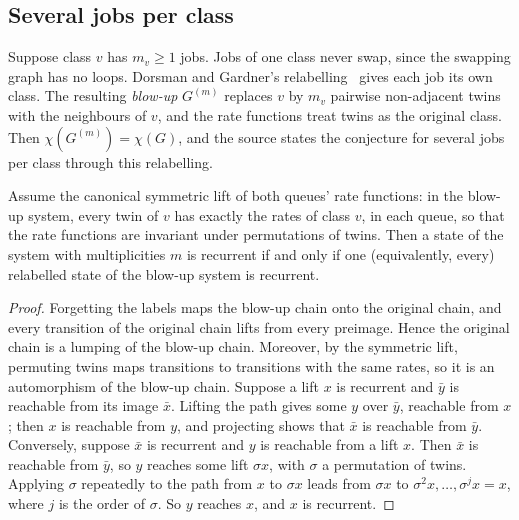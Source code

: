 \documentclass[11pt,a4paper]{article}
\theoremstyle{plain}
\theoremstyle{plain}
\begin{document}
\subsection{Several jobs per class}\label{sec:multiplicity}

Suppose class $v$ has $m_v\ge1$ jobs. Jobs of one class never swap, since the swapping graph has no loops. Dorsman and Gardner's relabelling~\cite[Remark~9]{DG2024} gives each job its own class. The resulting \emph{blow-up} $G^{(m)}$ replaces $v$ by $m_v$ pairwise non-adjacent twins with the neighbours of $v$, and the rate functions treat twins as the original class. Then $\chi(G^{(m)})=\chi(G)$, and the source states the conjecture for several jobs per class through this relabelling.

\begin{proposition}\label{prop:multiplicity}
Assume the canonical symmetric lift of both queues' rate functions: in the blow-up system, every twin of $v$ has exactly the rates of class $v$, in each queue, so that the rate functions are invariant under permutations of twins. Then a state of the system with multiplicities $m$ is recurrent if and only if one (equivalently, every) relabelled state of the blow-up system is recurrent.
\end{proposition}

\begin{proof}
Forgetting the labels maps the blow-up chain onto the original chain, and every transition of the original chain lifts from every preimage. Hence the original chain is a lumping of the blow-up chain. Moreover, by the symmetric lift, permuting twins maps transitions to transitions with the same rates, so it is an automorphism of the blow-up chain. Suppose a lift $x$ is recurrent and $\bar y$ is reachable from its image $\bar x$. Lifting the path gives some $y$ over $\bar y$, reachable from $x$; then $x$ is reachable from $y$, and projecting shows that $\bar x$ is reachable from $\bar y$. Conversely, suppose $\bar x$ is recurrent and $y$ is reachable from a lift $x$. Then $\bar x$ is reachable from $\bar y$, so $y$ reaches some lift $\sigma x$, with $\sigma$ a permutation of twins. Applying $\sigma$ repeatedly to the path from $x$ to $\sigma x$ leads from $\sigma x$ to $\sigma^2x,\dots,\sigma^jx=x$, where $j$ is the order of $\sigma$. So $y$ reaches $x$, and $x$ is recurrent.
\end{proof}
\end{document}
